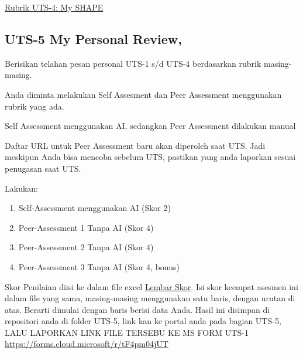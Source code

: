 \documentclass[
  letterpaper,
  DIV=11,
  numbers=noendperiod]{scrreprt}
\providecommand{\tightlist}{%
  \setlength{\itemsep}{0pt}\setlength{\parskip}{0pt}}
\begin{document}
\href{./asesmen/Rubrik_II-2100_CSV/UTS-4.csv}{Rubrik UTS-4: My SHAPE}

\subsection*{UTS-5 My Personal Review,}\label{uts-5-my-personal-review}

Berisikan telahan pesan personal UTS-1 s/d UTS-4 berdasarkan rubrik
masing-masing.

Anda diminta melakukan Self Assesment dan Peer Assessment menggunakan
rubrik yang ada.

Self Assessment menggunakan AI, sedangkan Peer Assessment dilakukan
manual

\begin{tcolorbox}[enhanced jigsaw, breakable, rightrule=.15mm, colbacktitle=quarto-callout-warning-color!10!white, opacityback=0, titlerule=0mm, leftrule=.75mm, bottomrule=.15mm, toptitle=1mm, colframe=quarto-callout-warning-color-frame, bottomtitle=1mm, arc=.35mm, coltitle=black, opacitybacktitle=0.6, toprule=.15mm, left=2mm, title=\textcolor{quarto-callout-warning-color}{\faExclamationTriangle}\hspace{0.5em}{Penugasan Peer Assignmen Baru Ada Nanti Saat UTS}, colback=white]

Daftar URL untuk Peer Assessment baru akan diperoleh saat UTS. Jadi
meskipun Anda bisa mencoba sebelum UTS, pastikan yang anda laporkan
sesuai penugasan saat UTS.

\end{tcolorbox}

Lakukan:

\begin{enumerate}
\def\labelenumi{\arabic{enumi}.}
\tightlist
\item
  Self-Assessment menggunakan AI (Skor 2)
\item
  Peer-Assessment 1 Tanpa AI (Skor 4)
\item
  Peer-Assessment 2 Tanpa AI (Skor 4)
\item
  Peer-Assessment 3 Tanpa AI (Skor 4, bonus)
\end{enumerate}

Skor Penilaian diisi ke dalam file excel
\href{./asesmen/UTS-5_Skor.xlsx}{Lembar Skor}. Isi skor keempat asesmen
ini dalam file yang sama, masing-masing menggunakan satu baris, dengan
urutan di atas. Berarti dimulai dengan baris berisi data Anda. Hasil ini
disimpan di repositori anda di folder UTS-5, link kan ke portal anda
pada bagian UTS-5, LALU LAPORKAN LINK FILE TERSEBU KE MS FORM UTS-1
\url{https://forms.cloud.microsoft/r/tF4pm04jUT}
\end{document}

